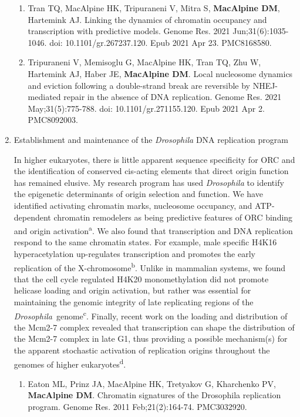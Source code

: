 \documentclass{update_nihbiosketch}
\newcommand\dros{{\itshape Drosophila}\xspace}
\begin{document}
\begin{enumerate}
\begin{enumerate}
\item Tran TQ, MacAlpine HK, Tripuraneni V, Mitra S, \textbf{MacAlpine DM}, Hartemink AJ. Linking the dynamics of chromatin occupancy and transcription with predictive models. Genome Res. 2021 Jun;31(6):1035-1046. doi: 10.1101/gr.267237.120. Epub 2021 Apr 23. PMC8168580.

\item Tripuraneni V, Memisoglu G, MacAlpine HK, Tran TQ, Zhu W, Hartemink AJ, Haber JE, \textbf{MacAlpine DM}. Local nucleosome dynamics and eviction following a double-strand break are reversible by NHEJ-mediated repair in the absence of DNA replication. Genome Res. 2021 May;31(5):775-788. doi: 10.1101/gr.271155.120. Epub 2021 Apr 2. PMC8092003.

\end{enumerate}


\item Establishment and maintenance of the \dros DNA replication program

In higher eukaryotes, there is little apparent sequence specificity for ORC and the identification of conserved cis-acting elements that direct origin function has remained elusive.  My research program has used \dros to identify the epigenetic determinants of origin selection and function. We have identified activating chromatin marks, nucleosome occupancy, and ATP-dependent chromatin remodelers as being predictive features of ORC binding and origin activation\textsuperscript{a}. We also found that transcription and DNA replication respond to the same chromatin states.  For example, male specific H4K16 hyperacetylation up-regulates transcription and promotes the early replication of the X-chromosome\textsuperscript{b}.  Unlike in mammalian systems, we found that the cell cycle regulated H4K20 monomethylation did not promote helicase loading and origin activation, but rather was essential for maintaining the genomic integrity of late replicating regions of the \dros\ genome\textsuperscript{c}.  Finally, recent work on the loading and distribution of the Mcm2-7 complex revealed that transcription can shape the distribution of the Mcm2-7 complex in late G1, thus providing a possible mechanism(s) for the apparent stochastic activation of replication origins throughout the genomes of higher eukaryotes\textsuperscript{d}.


\begin{enumerate}
\setlength\itemsep{0.35em}

\item Eaton ML, Prinz JA, MacAlpine HK, Tretyakov G, Kharchenko PV, \textbf{MacAlpine DM}. Chromatin signatures of the Drosophila replication program. Genome Res. 2011 Feb;21(2):164-74. PMC3032920.


\end{enumerate}
\end{enumerate}
\end{document}
